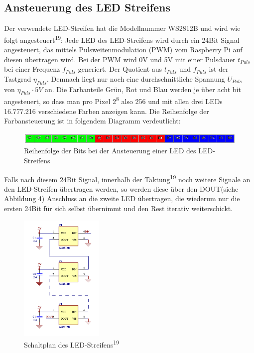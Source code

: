 \documentclass [a4paper, 11pt] {article}
\begin{document}
\subsection{Ansteuerung des LED Streifens}
Der verwendete LED-Streifen hat die Modellnummer WS2812B und wird wie folgt angesteuert\textsuperscript{19}:
Jede LED des LED-Streifens wird durch ein 24Bit Signal angesteuert, das mittels Pulsweitenmodulation (PWM) vom Raspberry Pi auf diesen übertragen wird. Bei der PWM wird 0V und 5V mit einer Pulsdauer $t_{Puls}$ bei einer Frequenz $f_{Puls}$ generiert. Der Quotient aus $t_{Puls}$ und $f_{Puls}$ ist der Tastgrad $\eta_{Puls}$. Demnach liegt nur noch eine durchschnittliche Spannung $U_{Puls}$ von $\eta_{Puls} \cdot 5V$ an. Die Farbanteile Grün, Rot und Blau werden je über acht bit angesteuert, so dass man pro Pixel 2\textsuperscript 8 also 256 und mit allen drei LEDs 16.777.216 verschiedene Farben anzeigen kann. Die Reihenfolge der Farbansteuerung ist in folgendem Diagramm verdeutlicht:
\begin{figure}[H]
	\centering
	\includegraphics[width=16cm]{AufbauDer24BitAnsteuerungDesStreifens.png}
	\caption{Reihenfolge der Bits bei der Ansteuerung einer LED des LED-Streifens}
	\label{bits}
\end{figure}
Falls nach diesem 24Bit Signal, innerhalb der Taktung\textsuperscript{19} noch weitere Signale an den LED-Streifen übertragen werden, so werden diese über den DOUT(siehe Abbildung 4) Anschluss an die zweite LED übertragen, die wiederum nur die ersten 24Bit für sich selbst übernimmt und den Rest iterativ weiterschickt.
\begin{figure}[H]
	\centering
	\includegraphics[width=4cm]{Schaltplan_des_LED-Streifens.png}
	\caption{Schaltplan des LED-Streifens\textsuperscript{19}}
	\label{Schaltplan}
\end{figure}
\end{document}
